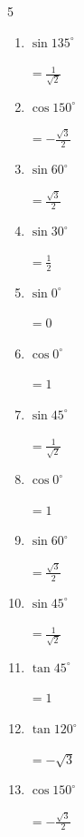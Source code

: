 \begin{multicols}{5}
\begin{enumerate}
  \item $\displaystyle \sin{135^\circ}$

        $\displaystyle =\frac{1}{\sqrt{2}}$

  \item $\displaystyle \cos{150^\circ}$

        $\displaystyle =-\frac{\sqrt{3}}{2}$

  \item $\displaystyle \sin{60^\circ}$

        $\displaystyle =\frac{\sqrt{3}}{2}$

  \item $\displaystyle \sin{30^\circ}$

        $\displaystyle =\frac{1}{2}$

  \item $\displaystyle \sin{0^\circ}$

        $\displaystyle =0$

  \item $\displaystyle \cos{0^\circ}$

        $\displaystyle =1$

  \item $\displaystyle \sin{45^\circ}$

        $\displaystyle =\frac{1}{\sqrt{2}}$

\columnbreak %

  \item $\displaystyle \cos{0^\circ}$

        $\displaystyle =1$

  \item $\displaystyle \sin{60^\circ}$

        $\displaystyle =\frac{\sqrt{3}}{2}$

  \item $\displaystyle \sin{45^\circ}$

        $\displaystyle =\frac{1}{\sqrt{2}}$

  \item $\displaystyle \tan{45^\circ}$

        $\displaystyle =1$

  \item $\displaystyle \tan{120^\circ}$

        $\displaystyle =-\sqrt{3}$

  \item $\displaystyle \cos{150^\circ}$

        $\displaystyle =-\frac{\sqrt{3}}{2}$


\end{enumerate}
\end{multicols}
